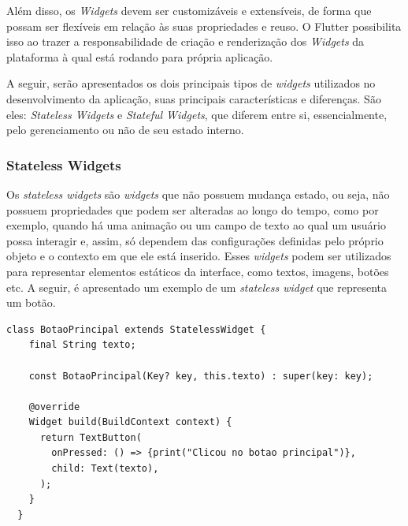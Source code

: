 Além disso, os \textit{Widgets} devem ser customizáveis e extensíveis, de forma que possam ser flexíveis em relação às suas propriedades e reuso. O Flutter possibilita isso ao trazer a responsabilidade de criação e renderização dos \textit{Widgets} da plataforma à qual está rodando para própria aplicação.


A seguir, serão apresentados os dois principais tipos de \textit{widgets} utilizados no desenvolvimento da aplicação, suas principais características e diferenças. São eles: \textit{Stateless Widgets} e \textit{Stateful Widgets}, que diferem entre si, essencialmente, pelo gerenciamento ou não de seu estado interno. %

\subsubsection{Stateless Widgets}
\label{cap2:SubSubSec:StatelessWidgets}
Os \textit{stateless widgets} são \textit{widgets} que não possuem mudança estado, ou seja, não possuem propriedades que podem ser alteradas ao longo do tempo, como por exemplo, quando há uma animação ou um campo de texto ao qual um usuário possa interagir e, assim, só dependem das configurações definidas pelo próprio objeto e o contexto em que ele está inserido. Esses \textit{widgets} podem ser utilizados para representar elementos estáticos da interface, como textos, imagens, botões etc. A seguir, é apresentado um exemplo de um \textit{stateless widget} que representa um botão.

\begin{lstlisting}[caption={Exemplo de um \textit{stateless widget} que representa um botão.}, label={lst:stateless_widget}]
  class BotaoPrincipal extends StatelessWidget {
    final String texto;
  
    const BotaoPrincipal(Key? key, this.texto) : super(key: key);
  
    @override
    Widget build(BuildContext context) {
      return TextButton(
        onPressed: () => {print("Clicou no botao principal")},
        child: Text(texto),
      );
    }
  }
\end{lstlisting}

